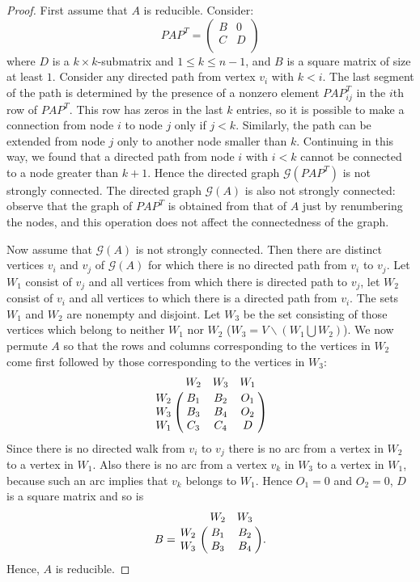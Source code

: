 \documentclass[a4paper,11pt]{report}
\newcommand{\graf}{\mathscr{G}}
\begin{document}
\begin{proof}
  First assume that $A$ is reducible. Consider:
   $$ PAP^T = \begin{pmatrix}  B  & 0\\
 C  & D\\
\end{pmatrix} $$
where $D$ is a $k \times k$-submatrix and $1 \leq k \leq n-1$, and $B$ is a square matrix of size at least $1$. 
Consider any directed path from vertex $v_i$ with $k < i$. The last segment of the path is determined by the presence of a 
nonzero element $PAP^T_{ij}$ in the $i$th row of $ PAP^T$. This row has zeros in the last 
$k$ entries, so it is possible to make a connection from node $i$ to node $j$ 
only if $j < k$. Similarly, the path can be extended from node $j$ only to 
another node smaller than $k$. Continuing in this way, we found that a 
directed path from node $i$ with $i < k$ cannot be connected to a node greater than $k +1$. Hence the
directed graph $\graf(PAP^T)$ is not strongly connected. The directed graph $\graf(A)$ 
is also not strongly connected: observe that the graph of  $PAP^T$ is obtained from that of $A$ just by renumbering the nodes, and
this operation does not affect the connectedness of the graph. 

Now assume that $\graf(A)$ is not strongly connected. Then there are distinct vertices $v_i$ and 
$v_j$ of $\graf(A)$ for which there is no directed path from $v_i$ to $v_j$. Let $W_1$ consist of
$v_j$ and all vertices from which there is directed path to $v_j$, let $W_2$ consist of $v_i$ and
all vertices to which there is a directed path from $v_i$. The sets $W_1$ and $W_2$ 
are nonempty and disjoint. Let $W_3$ be the set consisting of those vertices 
which belong to neither $W_1$ nor $W_2$ ($W_3 = V\backslash(W_1 \bigcup W_2)$). 
We now permute $A$ so that the rows and columns corresponding to the 
vertices in $W_2$ come first followed by those corresponding to the vertices in 
$W_3$:
$$\bordermatrix{\; &W_2&W_3&W_1\cr
                W_2&B_1 &  B_2  & O_{1}\cr
                W_3&B_3 &  B_4  & O_{2}\cr
                W_1&C_3 &  C_4 & D}$$
Since there is no directed walk from $v_i$ to $v_j$ there is no arc
from a vertex in $W_2$ to a vertex in $W_1$. Also there is no arc from
a vertex $v_k$ in $W_3$ to a vertex in $W_1$, because such an arc implies that $v_k$ 
belongs to $W_1$. Hence $O_{1} = 0$ and $O_{2} = 0$, $D$ is a square matrix
and so is
$$B = \bordermatrix{\; &W_2&W_3\cr
                W_2&B_1 &  B_2\cr
                W_3&B_3 &  B_4}.$$
                Hence,   $A$ is reducible.
\end{proof}
\end{document}

